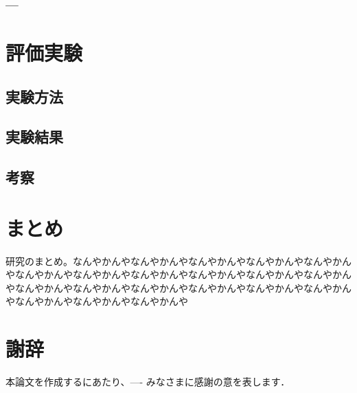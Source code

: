 \documentclass[11pt,a4j]{jreport}
\begin{document}
\subsection{---}

\chapter{評価実験}
\section{実験方法}
\section{実験結果}
\section{考察}

\chapter{まとめ}
研究のまとめ。なんやかんやなんやかんやなんやかんやなんやかんやなんやかんやなんやかんやなんやかんやなんやかんやなんやかんやなんやかんやなんやかんやなんやかんやなんやかんやなんやかんやなんやかんやなんやかんやなんやかんやなんやかんやなんやかんやなんやかんや

\chapter*{謝辞} %
本論文を作成するにあたり、---- みなさまに感謝の意を表します．


\renewcommand{\bibname}{参考文献} %
\end{document}
